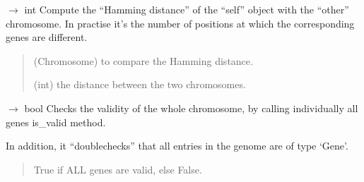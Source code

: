 \documentclass[letterpaper,10pt,english]{sphinxmanual}
\begin{document}
\begin{fulllineitems}
\begin{fulllineitems}
\label{\detokenize{pygenalgo.genome:pygenalgo.genome.chromosome.Chromosome.hamming_distance}}
\pysigstartsignatures
\pysiglinewithargsret
{}
{}
{{ $\rightarrow$ int}}
\pysigstopsignatures
\sphinxAtStartPar
Compute the “Hamming distance” of the “self” object with the
“other” chromosome. In practise it’s the number of positions
at which the corresponding genes are different.
\begin{quote}\begin{description}
\sphinxAtStartPar
{} \textendash{} (Chromosome) to compare the Hamming distance.

\sphinxAtStartPar
(int) the distance between the two chromosomes.

\end{description}\end{quote}

\end{fulllineitems}


\begin{fulllineitems}
\label{\detokenize{pygenalgo.genome:pygenalgo.genome.chromosome.Chromosome.is_genome_valid}}
\pysigstartsignatures
\pysiglinewithargsret
{}
{}
{{ $\rightarrow$ bool}}
\pysigstopsignatures
\sphinxAtStartPar
Checks the validity of the whole chromosome, by
calling individually all genes is\_valid method.

\sphinxAtStartPar
In addition, it “double\sphinxhyphen{}checks” that all entries
in the genome are of type ‘Gene’.
\begin{quote}\begin{description}
\sphinxAtStartPar
True if ALL genes are valid, else False.

\end{description}\end{quote}

\end{fulllineitems}



\end{fulllineitems}
\end{document}
